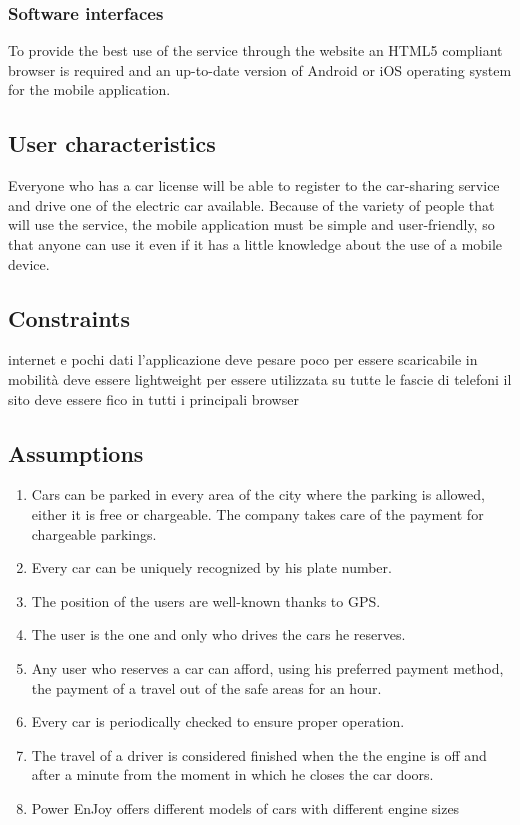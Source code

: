 \subsubsection{Software interfaces}
To provide the best use of the service through the website an HTML5 compliant browser is required and an up-to-date version of Android or iOS operating system for the mobile application.





\subsection{User characteristics}
Everyone who has a car license will be able to register to the car-sharing service and drive one of the electric car available.
Because of the variety of people that will use the service, the mobile application must be simple and user-friendly, so that anyone can use it even if it has a little knowledge about the use of a mobile device.

\subsection{Constraints}

internet e pochi dati
l'applicazione deve pesare poco per essere scaricabile in mobilità 
deve essere lightweight per essere utilizzata su tutte le fascie di telefoni
il sito deve essere fico in tutti i principali browser



\subsection{Assumptions}
\begin{enumerate}
	\item Cars can be parked in every area of the city where the parking is allowed, either it is free or chargeable. The company 		                    takes care of the payment for chargeable parkings. 
	\item Every car can be uniquely recognized by his plate number.
	\item The position of the users are well-known thanks to GPS.
	\item The user is the one and only who drives the cars he reserves.
	\item Any user who reserves a car can afford, using his preferred payment method, the payment of a 						         travel out of the safe areas for an hour.
	\item Every car is periodically checked to ensure proper operation.
	\item The travel of a driver is considered finished when the the engine is off and after a minute from the moment in which he 			         closes the car doors.
	\item Power EnJoy offers different models of cars with different engine sizes
\end{enumerate}

